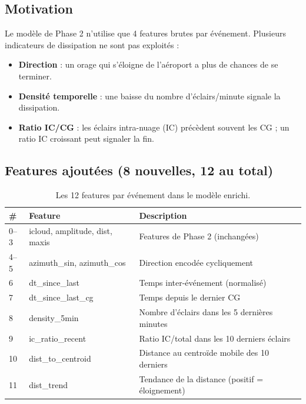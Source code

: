 \documentclass[11pt,a4paper]{article}
\begin{document}
\subsection{Motivation}

Le modèle de Phase 2 n'utilise que 4 features brutes par événement. Plusieurs indicateurs de dissipation ne sont pas exploités :

\begin{itemize}[nosep]
  \item \textbf{Direction} : un orage qui s'éloigne de l'aéroport a plus de chances de se terminer.
  \item \textbf{Densité temporelle} : une baisse du nombre d'éclairs/minute signale la dissipation.
  \item \textbf{Ratio IC/CG} : les éclairs intra-nuage (IC) précèdent souvent les CG ; un ratio IC croissant peut signaler la fin.
\end{itemize}

\subsection{Features ajoutées (8 nouvelles, 12 au total)}

\begin{table}[H]
\centering
\small
\begin{tabular}{@{}lll@{}}
\toprule
\textbf{\#} & \textbf{Feature} & \textbf{Description} \\
\midrule
0--3  & icloud, amplitude, dist, maxis & Features de Phase 2 (inchangées) \\
4--5  & azimuth\_sin, azimuth\_cos     & Direction encodée cycliquement \\
6     & dt\_since\_last                & Temps inter-événement (normalisé) \\
7     & dt\_since\_last\_cg            & Temps depuis le dernier CG \\
8     & density\_5min                  & Nombre d'éclairs dans les 5 dernières minutes \\
9     & ic\_ratio\_recent              & Ratio IC/total dans les 10 derniers éclairs \\
10    & dist\_to\_centroid             & Distance au centroïde mobile des 10 derniers \\
11    & dist\_trend                    & Tendance de la distance (positif = éloignement) \\
\bottomrule
\end{tabular}
\caption{Les 12 features par événement dans le modèle enrichi.}
\end{table}
\end{document}

